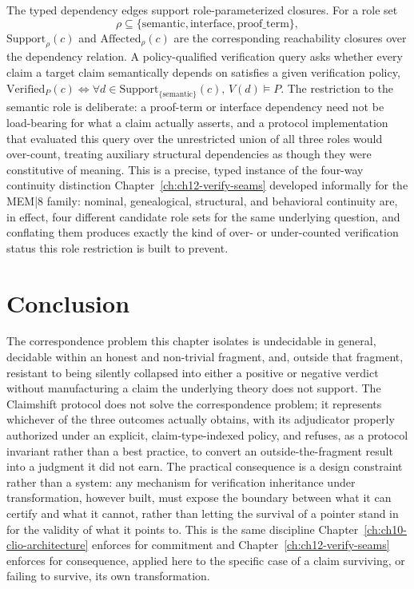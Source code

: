 The typed dependency edges support role-parameterized closures. For a role set
\[
\rho \subseteq \{\mathrm{semantic}, \mathrm{interface}, \mathrm{proof\_term}\},
\]
$\mathrm{Support}_\rho(c)$ and $\mathrm{Affected}_\rho(c)$ are the corresponding reachability closures over the dependency relation. A policy-qualified verification query asks whether every claim a target claim semantically depends on satisfies a given verification policy, $\mathrm{Verified}_P(c) \iff \forall d \in \mathrm{Support}_{\{\mathrm{semantic}\}}(c),\, V(d) \models P$. The restriction to the semantic role is deliberate: a proof-term or interface dependency need not be load-bearing for what a claim actually asserts, and a protocol implementation that evaluated this query over the unrestricted union of all three roles would over-count, treating auxiliary structural dependencies as though they were constitutive of meaning. This is a precise, typed instance of the four-way continuity distinction Chapter~\ref{ch:ch12-verify-seams} developed informally for the MEM|8 family: nominal, genealogical, structural, and behavioral continuity are, in effect, four different candidate role sets for the same underlying question, and conflating them produces exactly the kind of over- or under-counted verification status this role restriction is built to prevent.

\section{Conclusion}

The correspondence problem this chapter isolates is undecidable in general, decidable within an honest and non-trivial fragment, and, outside that fragment, resistant to being silently collapsed into either a positive or negative verdict without manufacturing a claim the underlying theory does not support. The Claimshift protocol does not solve the correspondence problem; it represents whichever of the three outcomes actually obtains, with its adjudicator properly authorized under an explicit, claim-type-indexed policy, and refuses, as a protocol invariant rather than a best practice, to convert an outside-the-fragment result into a judgment it did not earn. The practical consequence is a design constraint rather than a system: any mechanism for verification inheritance under transformation, however built, must expose the boundary between what it can certify and what it cannot, rather than letting the survival of a pointer stand in for the validity of what it points to. This is the same discipline Chapter~\ref{ch:ch10-clio-architecture} enforces for commitment and Chapter~\ref{ch:ch12-verify-seams} enforces for consequence, applied here to the specific case of a claim surviving, or failing to survive, its own transformation.
